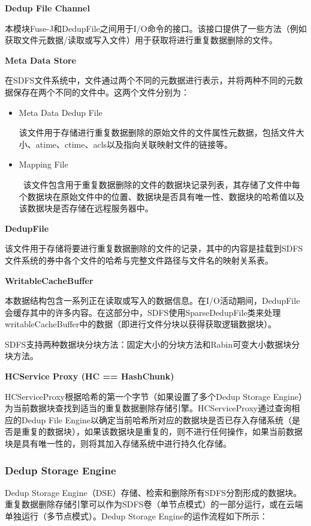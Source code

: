 \textbf{Dedup File Channel}

本模块Fuse-J和DedupFile之间用于I/O命令的接口。该接口提供了一些方法（例如获取文件元数据/读取或写入文件）用于获取将进行重复数据删除的文件。

\textbf{Meta Data Store}


在SDFS文件系统中，文件通过两个不同的元数据进行表示，并将两种不同的元数据保存在两个不同的文件中。这两个文件分别为：

\begin{itemize}
    \item Meta Data Dedup File
    
    该文件用于存储进行重复数据删除的原始文件的文件属性元数据，包括文件大小、atime、ctime、acls以及指向关联映射文件的链接等。
    
    \item Mapping File

     该文件包含用于重复数据删除的文件的数据块记录列表，其存储了文件中每个数据块在原始文件中的位置、数据块是否具有唯一性、数据块的哈希值以及该数据块是否存储在远程服务器中。
\end{itemize}

\textbf{DedupFile}

该文件用于存储将要进行重复数据删除的文件的记录，其中的内容是挂载到SDFS文件系统的券中各个文件的哈希与完整文件路径与文件名的映射关系表。

\textbf{WritableCacheBuffer}

本数据结构包含一系列正在读取或写入的数据信息。在I/O活动期间，DedupFile会缓存其中的许多内容。在这部分中，SDFS使用SparseDedupFile类来处理writableCacheBuffer中的数据（即进行文件分块以获得获取逻辑数据块）。

SDFS支持两种数据块分块方法：固定大小的分块方法和Rabin可变大小数据块分块方法。

\textbf{HCService Proxy (HC == HashChunk)}

HCServiceProxy根据哈希的第一个字节（如果设置了多个Dedup Storage Engine）为当前数据块查找到适当的重复数据删除存储引擎。HCServiceProxy通过查询相应的Dedup File Engine以确定当前哈希所对应的数据块是否已存入存储系统（是否是重复的数据块），如果该数据块是重复的，则不进行任何操作，如果当前数据块是具有唯一性的，则将其加入存储系统中进行持久化存储。 


\subsubsection{Dedup Storage Engine}

Dedup Storage Engine（DSE）存储、检索和删除所有SDFS分割形成的数据块。重复数据删除存储引擎可以作为SDFS卷（单节点模式）的一部分运行，或在云端单独运行（多节点模式）。Dedup Storage Engine的运作流程如下所示： 

